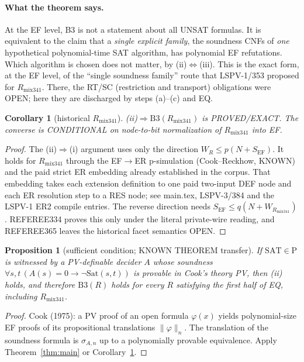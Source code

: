 \documentclass[11pt]{article}
\newtheorem{corollary}[theorem]{Corollary}
\newtheorem{proposition}[theorem]{Proposition}
\newcommand{\SAT}{\mathrm{SAT}}
\newcommand{\EF}{\mathrm{EF}}
\begin{document}
\paragraph{What the theorem says.} At the EF level, B3 is not a statement
about all UNSAT formulas. It is equivalent to the claim that a \emph{single
explicit family}, the soundness CNFs of \emph{one} hypothetical
polynomial-time SAT algorithm, has polynomial EF refutations. Which algorithm
is chosen does not matter, by (ii)$\Leftrightarrow$(iii). This is the exact form,
at the EF level, of the ``single soundness family'' route that
LSPV-1/353 proposed for $R_{\mathrm{mix341}}$. There, the RT/SC (restriction and
transport) obligations were OPEN; here they are discharged by steps (a)--(c) and
EQ.

\begin{corollary}[historical $R_{\mathrm{mix341}}$]\label{cor:mix}
(ii)$\Rightarrow\mathrm{B3}(R_{\mathrm{mix341}})$ is PROVED/EXACT. The converse is
CONDITIONAL on node-to-bit normalization of $R_{\mathrm{mix341}}$ into EF.
\end{corollary}
\begin{proof}
The (ii)$\Rightarrow$(i) argument uses only the direction
$W_R\le p(N+S_{\EF})$. It holds for $R_{\mathrm{mix341}}$ through the
EF$\to$ER p-simulation (Cook--Reckhow, KNOWN) and the paid strict ER embedding
already established in the corpus. That embedding takes each extension
definition to one paid two-input DEF node and each ER resolution step to a RES
node; see main.tex, LSPV-3/384 and the LSPV-1 ER2 compile entries. The reverse
direction needs $S_{\EF}\le q(N+W_{R_{\mathrm{mix341}}})$. REFEREE334 proves this
only under the literal private-wire reading, and REFEREE365 leaves the
historical facet semantics OPEN.
\end{proof}

\begin{proposition}[sufficient condition; KNOWN THEOREM transfer]\label{prop:pv}
If $\SAT\in\mathrm P$ is witnessed by a PV-definable decider $A$ whose soundness
$\forall s,t\,(A(s)=0\to\neg\mathrm{Sat}(s,t))$ is provable in Cook's theory PV,
then (ii) holds, and therefore $\mathrm{B3}(R)$ holds for every $R$ satisfying the
first half of EQ, including $R_{\mathrm{mix341}}$.
\end{proposition}
\begin{proof}
Cook (1975): a PV proof of an open formula $\varphi(x)$ yields polynomial-size EF
proofs of its propositional translations $\|\varphi\|_n$. The translation of
the soundness formula is $\sigma_{A,n}$ up to a polynomially provable
equivalence. Apply Theorem~\ref{thm:main} or Corollary~\ref{cor:mix}.
\end{proof}
\end{document}
